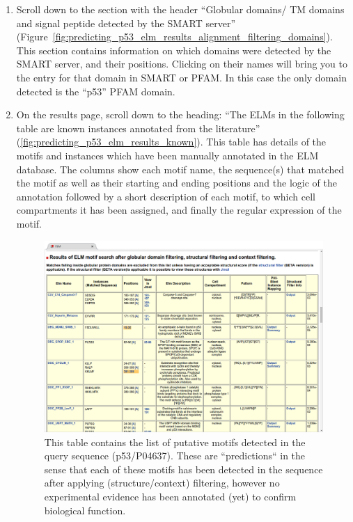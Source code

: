 \documentclass[12pt]{article}
\begin{document}
\begin{enumerate}
\item Scroll down to the section with the header ``Globular domains/ TM domains
	and signal peptide detected by the SMART server''
	(Figure~\ref{fig:predicting_p53_elm_results_alignment_filtering_domains}).
	This section contains information on which domains were detected by the
	SMART server, and their positions. Clicking on their names will bring
	you to the entry for that domain in SMART or PFAM.
	In this case the only domain detected is the ``p53'' PFAM domain.

\item On the results page, scroll down to the heading: ``The ELMs in the
	following table are known instances annotated from the literature''
	(\ref{fig:predicting_p53_elm_results_known}).
	This table has details of the motifs and instances which have been
	manually annotated in the ELM database. The columns show each motif
	name, the sequence(s) that matched the motif as well as their starting
	and ending positions and the logic of the annotation followed by a
	short description of each motif, to which cell compartments it has
	been assigned, and finally the regular expression of the motif.

\begin{figure}[h!]
	\centering
	\includegraphics[width=\textwidth]{Figures/26_elm_results_motifs.png}
	\caption{
	This table contains the list of putative motifs detected in the query
	sequence (p53/P04637). These are ``predictions`` in the sense that each
	of these motifs has been detected in the sequence after applying
	(structure/context) filtering, however no experimental evidence has been
	annotated (yet) to confirm biological function.
	}
	\label{fig:predicting_p53_elm_results_motifs}
\end{figure}


\end{enumerate}
\end{document}
